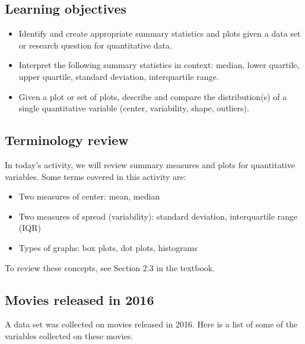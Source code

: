 \documentclass[
]{report}
\begin{document}

\hypertarget{learning-objectives}{%
\subsection{Learning objectives}\label{learning-objectives}}

\begin{itemize}
\item
  Identify and create appropriate summary statistics and plots
  given a data set or research question for quantitative data.
\item
  Interpret the following summary statistics in context:
  median, lower quartile, upper quartile,
  standard deviation, interquartile range.
\item
  Given a plot or set of plots, describe and compare the distribution(s)
  of a single quantitative variable
  (center, variability, shape, outliers).
\end{itemize}

\hypertarget{terminology-review-7}{%
\subsection{Terminology review}\label{terminology-review-7}}

In today's activity, we will review summary measures and plots for quantitative variables. Some terms covered in this activity are:

\begin{itemize}
\item
  Two measures of center: mean, median
\item
  Two measures of spread (variability): standard deviation, interquartile range (IQR)
\item
  Types of graphs: box plots, dot plots, histograms
\end{itemize}

To review these concepts, see Section 2.3 in the textbook.

\hypertarget{movies-released-in-2016}{%
\subsection{Movies released in 2016}\label{movies-released-in-2016}}

A data set was collected on movies released in 2016. Here is a list of some of the variables collected on these movies.
\end{document}
